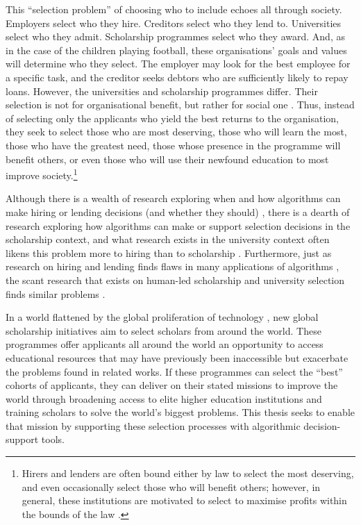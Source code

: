 This ``selection problem'' of choosing who to include echoes all through society. Employers select who they hire. Creditors select who they lend to. Universities select who they admit. Scholarship programmes select who they award. And, as in the case of the children playing football, these organisations' goals and values will determine who they select. The employer may look for the best employee for a specific task, and the creditor seeks debtors who are sufficiently likely to repay loans. However, the universities and scholarship programmes differ. Their selection is not for organisational benefit, but rather for social one \cite{Warikoo_2019}. Thus, instead of selecting only the applicants who yield the best returns to the organisation, they seek to select those who are most deserving, those who will learn the most, those who have the greatest need, those whose presence in the programme will benefit others, or even those who will use their newfound education to most improve society.\footnote{Hirers and lenders are often bound either by law to select the most deserving, and even occasionally select those who will benefit others; however, in general, these institutions are motivated to select to maximise profits within the bounds of the law \cite{schmidt1998validity}.}

Although there is a wealth of research exploring when and how algorithms can make hiring or lending decisions (and whether they should) \cite{schmidt1998validity,schumann2017diverse,raghavan2020mitigating,horodyski_applicants_2023,Leung_Zhang_Jibuti_Zhao_Klein_Pierce_Robert_Zhu_2020}, there is a dearth of research exploring how algorithms can make or support selection decisions in the scholarship context, and what research exists in the university context often likens this problem more to hiring than to scholarship \cite{schumann2017diverse,steel_multiple_2018,ijcai2023p819}. Furthermore, just as research on hiring and lending finds flaws in many applications of algorithms \cite{raghavan2020mitigating,horodyski_applicants_2023,Peng_Nushi_Kıcıman_Inkpen_Suri_Kamar_2019}, the scant research that exists on human-led scholarship and university selection finds similar problems \cite{schumann2017diverse}.

In a world flattened by the global proliferation of technology \cite{Friedman_2005}, new global scholarship initiatives aim to select scholars from around the world. These programmes offer applicants all around the world an opportunity to access educational resources that may have previously been inaccessible but exacerbate the problems found in related works. If these programmes can select the ``best'' cohorts of applicants, they can deliver on their stated missions to improve the world through broadening access to elite higher education institutions and training scholars to solve the world's biggest problems. This thesis seeks to enable that mission by supporting these selection processes with algorithmic decision-support tools.

